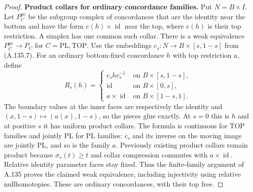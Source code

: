 \begin{proof}
\textbf{Product collars for ordinary concordance families.}
Put $N=B\times I$. Let $P_C^{\mathrm{pc}}$ be the subgroup complex of
concordances that are the identity near the bottom and have the form
$e(h)\times\operatorname{id}$ near the top, where $e(h)$ is their top
restriction. A simplex has one common such collar.
There is a weak equivalence
$P_C^{\mathrm{pc}}\to P_C$ for $C=\mathrm{PL},\mathrm{TOP}$.
Use the embeddings $c_s:N\to B\times[s,1-s]$ from (A.135.7).
For an ordinary bottom-fixed concordance $h$ with top restriction $a$,
define
\[
 R_s(h)=
 \begin{cases}
 c_s h c_s^{-1}&\text{on }B\times[s,1-s],\\
 \operatorname{id}&\text{on }B\times[0,s],\\
 a\times\operatorname{id}&\text{on }B\times[1-s,1].
 \end{cases}                                           \tag{A.136.6}
\]
The boundary values at the inner faces are respectively the identity
and $(x,1-s)\mapsto(a(x),1-s)$, so the pieces glue exactly.
At $s=0$ this is $h$ and at positive $s$ it has uniform product collars.
The formula is continuous for TOP families and jointly PL for PL
families: $c_s$ and its inverse on the moving image are jointly PL,
and so is the family $a$. Previously existing product collars remain
product because $\sigma_s(t)\ge t$ and collar compression commutes
with $a\times\operatorname{id}$. Relative identity parameter faces
stay fixed. Thus the finite-family argument of A.135 proves the
claimed weak equivalence, including injectivity using relative
nullhomotopies. These are ordinary concordances, with their top free.


\end{proof}
